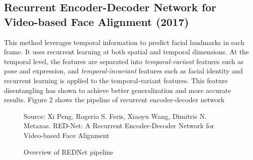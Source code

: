 \documentclass{llncs}
\begin{document}
\subsection{Recurrent Encoder-Decoder Network for Video-based Face Alignment (2017)}

This method leverages temporal information to predict facial landmarks in each frame. It uses recurrent learning at both spatial and temporal dimensions. At the temporal level, the features are separated into \textit{temporal-variant} features such as pose and expression, and \textit{temporal-invariant} features such as facial identity and recurrent learning is applied to the temporal-variant features. This feature disentangling has shown to achieve better generalization and more accurate results. Figure 2 shows the pipeline of recurrent encoder-decoder network \\

\begin{figure}
%
{Source: Xi Peng, Rogerio S. Feris, Xiaoyu Wang, Dimitris N. Metaxas. RED-Net: A Recurrent Encoder-Decoder Network for Video-based Face Alignment}
\caption{Overview of REDNet pipeline}
\end{figure}
\end{document}
